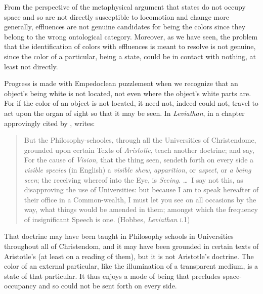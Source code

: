 From the perspective of the metaphysical argument that states do not occupy space and so are not directly susceptible to locomotion and change more generally, effluences are not genuine candidates for being the colors since they belong to the wrong ontological category. Moreover, as we have seen, the problem that the identification of colors with effluences is meant to resolve is not genuine, since the color of a particular, being a state, could be in contact with nothing, at least not directly.

Progress is made with Empedoclean puzzlement when we recognize that an object's being white is not located, not even where the object's white parts are. For if the color of an object is not located, it need not, indeed could not, travel to act upon the organ of sight so that it may be seen. In \emph{Leviathan}, in a chapter approvingly cited by \citet[26 n7]{Burnyeat:1992fk}, \citet{Hobbes:1651fk} writes:
\begin{quote}
	But the Philosophy-schooles, through all the Universities of Christendome, grounded upon certain Texts of \emph{Aristotle}, teach another doctrine; and say, For the cause of \emph{Vision}, that the thing seen, sendeth forth on every side a \emph{visible species} (in English) a \emph{visible shew}, \emph{apparition}, or \emph{aspect}, or \emph{a being seen}; the receiving whereof into the Eye, is \emph{Seeing}. \ldots\ I say not this, as disapproving the use of Universities: but because I am to speak hereafter of their office in a Common-wealth, I must let you see on all occasions by the way, what things would be amended in them; amongst which the frequency of insignificant Speech is one. (Hobbes, \emph{Leviathan} \textsc{i}.1)
\end{quote}
That doctrine may have been taught in Philosophy schools in Universities throughout all of Christendom, and it may have been grounded in certain texts of Aristotle's (at least on a reading of them), but it is not Aristotle's doctrine. The color of an external particular, like the illumination of a transparent medium, is a state of that particular. It thus enjoys a mode of being that precludes space-occupancy and so could not be sent forth on every side.

